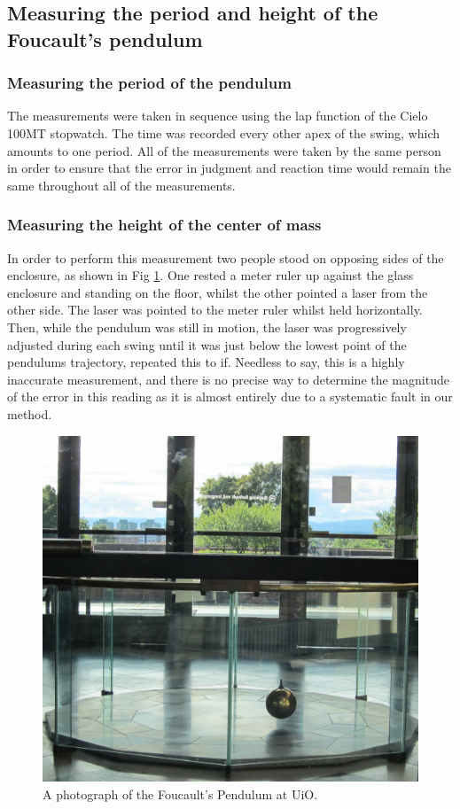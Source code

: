 \documentclass[11pt,a4paper]{article}
\begin{document}
  \subsection{Measuring the period and height of the Foucault's pendulum}

    \subsubsection{\label{subsect:exp_period}Measuring the period of the pendulum}
    The measurements were taken in sequence using the lap function of the Cielo 100MT \cite{cielo} stopwatch. The time was recorded every other apex of the swing, which amounts to one period. All of the measurements were taken by the same person in order to ensure that the error in judgment and reaction time would remain the same throughout all of the measurements.

    \subsubsection{Measuring the height of the center of mass}
      In order to perform this measurement two people stood on opposing sides of the enclosure, as shown in Fig \ref{fig:pendelfy}. One rested a meter ruler up against the glass enclosure and standing on the floor, whilst the other pointed a laser from the other side. The laser was pointed to the meter ruler whilst held horizontally. Then, while the pendulum was still in motion, the laser was progressively adjusted during each swing until it was just below the lowest point of the pendulums trajectory, repeated this to if. Needless to say, this is a highly inaccurate measurement, and there is no precise way to determine the magnitude of the error in this reading as it is almost entirely due to a systematic fault in our method.
      \begin{figure}[H]
        \center 
        \includegraphics[scale=0.15]{scripts/figs/pendelimg.JPG}
        \caption{A photograph of the Foucault's Pendulum at UiO.}
        \label{fig:pendelfy}
      \end{figure}
\end{document}
